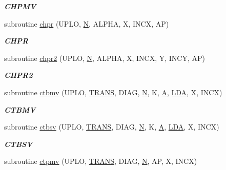 \begin{DoxyCompactItemize}
\begin{DoxyCompactList}\small\item\em {\bfseries C\+H\+P\+M\+V} \end{DoxyCompactList}\item 
subroutine \hyperlink{group__complex__blas__level2_gac98100eee08124fb7a5d55effbb85a65}{chpr} (U\+P\+L\+O, \hyperlink{polmisc_8c_a0240ac851181b84ac374872dc5434ee4}{N}, A\+L\+P\+H\+A, X, I\+N\+C\+X, A\+P)
\begin{DoxyCompactList}\small\item\em {\bfseries C\+H\+P\+R} \end{DoxyCompactList}\item 
subroutine \hyperlink{group__complex__blas__level2_ga537b8bcd05cbe626ebce0fbc8d66a2d6}{chpr2} (U\+P\+L\+O, \hyperlink{polmisc_8c_a0240ac851181b84ac374872dc5434ee4}{N}, A\+L\+P\+H\+A, X, I\+N\+C\+X, Y, I\+N\+C\+Y, A\+P)
\begin{DoxyCompactList}\small\item\em {\bfseries C\+H\+P\+R2} \end{DoxyCompactList}\item 
subroutine \hyperlink{group__complex__blas__level2_ga2483c6533c8a24ff715137629f939074}{ctbmv} (U\+P\+L\+O, \hyperlink{superlu__enum__consts_8h_a0c4e17b2d5cea33f9991ccc6a6678d62a1f61e3015bfe0f0c2c3fda4c5a0cdf58}{T\+R\+A\+N\+S}, D\+I\+A\+G, \hyperlink{polmisc_8c_a0240ac851181b84ac374872dc5434ee4}{N}, K, \hyperlink{classA}{A}, \hyperlink{example__user_8c_ae946da542ce0db94dced19b2ecefd1aa}{L\+D\+A}, X, I\+N\+C\+X)
\begin{DoxyCompactList}\small\item\em {\bfseries C\+T\+B\+M\+V} \end{DoxyCompactList}\item 
subroutine \hyperlink{group__complex__blas__level2_ga47f0128bb830b67b37b285af34eaad5f}{ctbsv} (U\+P\+L\+O, \hyperlink{superlu__enum__consts_8h_a0c4e17b2d5cea33f9991ccc6a6678d62a1f61e3015bfe0f0c2c3fda4c5a0cdf58}{T\+R\+A\+N\+S}, D\+I\+A\+G, \hyperlink{polmisc_8c_a0240ac851181b84ac374872dc5434ee4}{N}, K, \hyperlink{classA}{A}, \hyperlink{example__user_8c_ae946da542ce0db94dced19b2ecefd1aa}{L\+D\+A}, X, I\+N\+C\+X)
\begin{DoxyCompactList}\small\item\em {\bfseries C\+T\+B\+S\+V} \end{DoxyCompactList}\item 
subroutine \hyperlink{group__complex__blas__level2_gafb7324ce48931e58b392dd6eef9a286c}{ctpmv} (U\+P\+L\+O, \hyperlink{superlu__enum__consts_8h_a0c4e17b2d5cea33f9991ccc6a6678d62a1f61e3015bfe0f0c2c3fda4c5a0cdf58}{T\+R\+A\+N\+S}, D\+I\+A\+G, \hyperlink{polmisc_8c_a0240ac851181b84ac374872dc5434ee4}{N}, A\+P, X, I\+N\+C\+X)

\end{DoxyCompactItemize}
